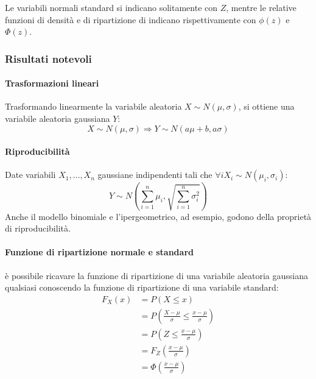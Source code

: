 Le variabili normali standard si indicano solitamente con $Z$, mentre le relative funzioni di densità e di ripartizione di indicano rispettivamente con $\phi(z)$ e $\Phi(z)$.


\subsubsection{Risultati notevoli}

\paragraph{Trasformazioni lineari} Trasformando linearmente la variabile aleatoria $X\sim N(\mu,\sigma)$, si ottiene una variabile aleatoria gaussiana $Y$:
\begin{equation*}
	X\sim N(\mu,\sigma) \Rightarrow Y\sim N(a\mu+b,a\sigma)
\end{equation*}

\paragraph{Riproducibilità} Date variabili $X_1,\dots,X_n$ gaussiane indipendenti tali che $\forall i X_i\sim N(\mu_i,\sigma_i)$:
\begin{equation*}
	Y\sim N\left(\sum_{i=1}^n \mu_i,\sqrt{\sum_{i=1}^n \sigma_i^2}\right)
\end{equation*}
Anche il modello binomiale e l'ipergeometrico, ad esempio, godono della proprietà di riproducibilità.

\paragraph{Funzione di ripartizione normale e standard} è possibile ricavare la funzione di ripartizione di una variabile aleatoria gaussiana qualsiasi conoscendo la funzione di ripartizione di una variabile standard:
\begin{align*}
	F_X(x) & = P(X\leq x)                                                 \\
	       & = P\left(\frac{X-\mu}{\sigma}\leq\frac{x-\mu}{\sigma}\right) \\
	       & = P\left(Z\leq \frac{x-\mu}{\sigma}\right)                   \\
	       & = F_Z\left(\frac{x-\mu}{\sigma}\right)                       \\
	       & = \Phi\left(\frac{x-\mu}{\sigma}\right)
\end{align*}


